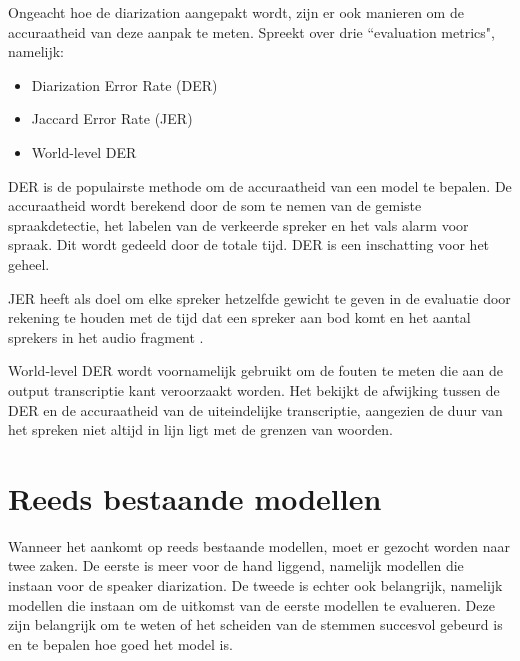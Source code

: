 Ongeacht hoe de diarization aangepakt wordt, zijn er ook manieren om de accuraatheid van deze aanpak te meten.  \textcite{Park2021} Spreekt over drie ``evaluation metrics", namelijk:
\begin{itemize}
	\item Diarization Error Rate (DER)
	\item Jaccard Error Rate (JER)
	\item World-level DER
\end{itemize}
DER is de populairste methode om de accuraatheid van een model te bepalen. De accuraatheid wordt berekend door de som te nemen van de gemiste spraakdetectie, het labelen van de verkeerde spreker en het vals alarm voor spraak. Dit wordt gedeeld door de totale tijd. DER is een inschatting voor het geheel. \autocite{Park2021}

JER heeft als doel om elke spreker hetzelfde gewicht te geven in de evaluatie door rekening te houden met de tijd dat een spreker aan bod komt en het aantal sprekers in het audio fragment \autocite{Park2021}.

World-level DER wordt voornamelijk gebruikt om de fouten te meten die aan de output transcriptie kant veroorzaakt worden. Het bekijkt de afwijking tussen de DER en de accuraatheid van de uiteindelijke transcriptie, aangezien de duur van het spreken niet altijd in lijn ligt met de grenzen van woorden. \autocite{Park2021}

\section{Reeds bestaande modellen}
\label{sec:bestaande-modellen}
Wanneer het aankomt op reeds bestaande modellen, moet er gezocht worden naar twee zaken. De eerste is meer voor de hand liggend, namelijk modellen die instaan voor de speaker diarization. De tweede is echter ook belangrijk, namelijk modellen die instaan om de uitkomst van de eerste modellen te evalueren. Deze zijn belangrijk om te weten of het scheiden van de stemmen succesvol gebeurd is en te bepalen hoe goed het model is.

